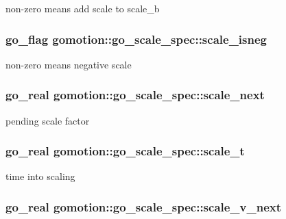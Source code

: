 non-\/zero means add scale to scale\-\_\-b \hypertarget{structgomotion_1_1go__scale__spec_abd719098dc45e827d7349e8eb682f2c2}{
\subsubsection[{scale\-\_\-isneg}]{\setlength{\rightskip}{0pt plus 5cm}go\-\_\-flag gomotion\-::go\-\_\-scale\-\_\-spec\-::scale\-\_\-isneg}}\label{structgomotion_1_1go__scale__spec_abd719098dc45e827d7349e8eb682f2c2}
non-\/zero means negative scale \hypertarget{structgomotion_1_1go__scale__spec_ab141b03f6bb455d94cbeebf6c9de5cc3}{
\subsubsection[{scale\-\_\-next}]{\setlength{\rightskip}{0pt plus 5cm}go\-\_\-real gomotion\-::go\-\_\-scale\-\_\-spec\-::scale\-\_\-next}}\label{structgomotion_1_1go__scale__spec_ab141b03f6bb455d94cbeebf6c9de5cc3}
pending scale factor \hypertarget{structgomotion_1_1go__scale__spec_a7496e98c2084abd59d74c803b1d7dbec}{
\subsubsection[{scale\-\_\-t}]{\setlength{\rightskip}{0pt plus 5cm}go\-\_\-real gomotion\-::go\-\_\-scale\-\_\-spec\-::scale\-\_\-t}}\label{structgomotion_1_1go__scale__spec_a7496e98c2084abd59d74c803b1d7dbec}
time into scaling \hypertarget{structgomotion_1_1go__scale__spec_a72b34038e403e2efffd083765389c5f2}{
\subsubsection[{scale\-\_\-v\-\_\-next}]{\setlength{\rightskip}{0pt plus 5cm}go\-\_\-real gomotion\-::go\-\_\-scale\-\_\-spec\-::scale\-\_\-v\-\_\-next}}\label{structgomotion_1_1go__scale__spec_a72b34038e403e2efffd083765389c5f2}
